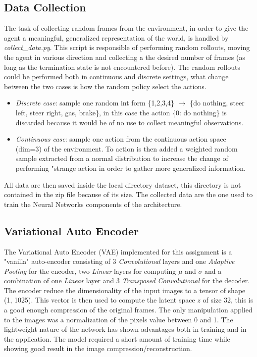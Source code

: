 \documentclass[10pt,a4paper]{article}
\begin{document}
\subsection{Data Collection}
The task of collecting random frames from the environment, in order to give the agent a meaningful, generalized representation of the world, is handled by \textit{collect\_data.py}. This script is responsible of performing random rollouts, moving the agent in various direction and collecting a the desired number of frames (as long as the termination state is not encountered before). The random rollouts could be performed both in continuous and discrete settings, what change between the two cases is how the random policy select the actions.
\begin{itemize}
    \item \textit{Discrete case}: sample one random int form \{1,2,3,4\} $\rightarrow$ \{do nothing, steer left, steer right, gas, brake\}, in this case the action \{0: do nothing\} is discarded because it would be of no use to collect meaningful observations. 
    \item \textit{Continuous case}: sample one action from the continuous action space (dim=3) of the environment. To action is then added a weighted random sample extracted from a normal distribution to increase the change of performing "strange action in order to gather more generalized information. 
\end{itemize}
All data are then saved inside the local directory dataset, this directory is not contained in the zip file because of its size. The collected data are the one used to train the Neural Networks components of the architecture.


\subsection{Variational Auto Encoder}
The Variational Auto Encoder (VAE) implemented for this assignment is a "vanilla" auto-encoder consisting of 3 \textit{Convolutional} layers and one \textit{Adaptive Pooling} for the encoder, two \textit{Linear} layers for computing $\mu$ and $\sigma$ and a combination of one \textit{Linear} layer and 3 \textit{Transposed Convolutional} for the decoder. The encoder reduce the dimensionality of the input images to a tensor of shape (1, 1025). This vector is then used to compute the latent space $z$ of size 32, this is a good enough compression of the original frames. The only manipulation applied to the images was a normalization of the pixels value between 0 and 1. The lightweight nature of the network has shown advantages both in training and in the application. The model required a short amount of training time while showing good result in the image compression/reconstruction. 
\end{document}
